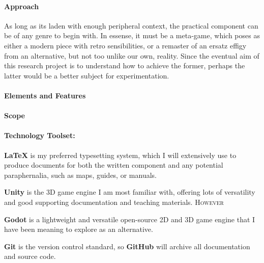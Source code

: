 \documentclass[12pt]{article}
\begin{document}
\paragraph{Approach}As long as its laden with enough peripheral context, the practical component can be of any genre to begin with.
In essense, it must be a meta-game, which poses as either a modern piece with retro sensibilities, or a remaster of an ersatz effigy from an alternative, but not too unlike our own, reality.
Since the eventual aim of this research project is to understand how to achieve the former, perhaps the latter would be a better subject for experimentation.
\paragraph{Elements and Features}
\paragraph{Scope}
    
\paragraph{Technology Toolset:}
\begin{description}[noitemsep]
    \item{\textbf{\LaTeX}} is my preferred typesetting system, which I will extensively use to produce documents for both the written component and any potential paraphernalia, such as maps, guides, or manuals.
    \item{\textbf{Unity}} is the 3D game engine I am most familiar with, offering lots of versatility and good supporting documentation and teaching materials. \textsc{However}
    \item{\textbf{Godot}} is a lightweight and versatile open-source 2D and 3D game engine that I have been meaning to explore as an alternative. 
    \item{\textbf{Git}} is the version control standard, so \textbf{GitHub} will archive all documentation and source code.
\end{description}
\end{document}
